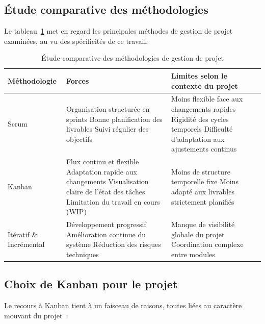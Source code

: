 \subsection{Étude comparative des méthodologies}
Le tableau~\ref{tab:comparaison-methodologies} met en regard les principales méthodes de
gestion de projet examinées, au vu des spécificités de ce travail.

\begin{table}[H]
    \centering
    \footnotesize
    \begin{tabularx}{\textwidth}{|>{\raggedright\arraybackslash}p{3cm}|>{\raggedright\arraybackslash}X|>{\raggedright\arraybackslash}X|}
        \hline
        \rowcolor{tableRow1}
        \textbf{Méthodologie} & \textbf{Forces} & \textbf{Limites selon le contexte du projet} \\
        \hline
        Scrum &
        Organisation structurée en sprints \newline Bonne planification des livrables \newline Suivi régulier des objectifs &
        Moins flexible face aux changements rapides \newline Rigidité des cycles temporels \newline Difficulté d'adaptation aux ajustements continus \\
        \hline
        Kanban &
        Flux continu et flexible \newline Adaptation rapide aux changements \newline Visualisation claire de l'état des tâches \newline Limitation du travail en cours (WIP) &
        Moins de structure temporelle fixe \newline Moins adapté aux livrables strictement planifiés \\
        \hline
        Itératif \& Incrémental &
        Développement progressif \newline Amélioration continue du système \newline Réduction des risques techniques &
        Manque de visibilité globale du projet \newline Coordination complexe entre modules \\
        \hline
    \end{tabularx}
    \caption{Étude comparative des méthodologies de gestion de projet}
    \label{tab:comparaison-methodologies}
\end{table}

\subsection{Choix de Kanban pour le projet}
Le recours à Kanban tient à un faisceau de raisons, toutes liées au caractère mouvant du
projet~:

